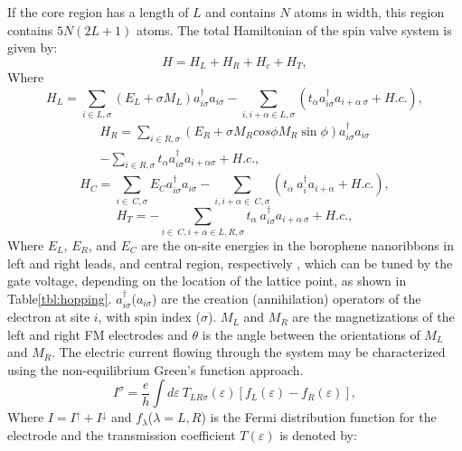 \documentclass[twoside,twocolumn,9pt]{article}
\begin{document}
If the core region has a length of $L$ and contains $N$ atoms in width, this region contains $5N(2L + 1)$ atoms. The total Hamiltonian of the spin valve system is given by:
\begin{equation}
    H= H_L + H_R + H_c + H_T,
\end{equation}
Where
\begin{equation}
H_{L}=\sum\limits_{i\in L,\sigma }{\left( E_{L}+\sigma M_{L} \right)} a_{i\sigma }^{\dagger} a_{i\sigma }-\sum\limits_{i,i+\alpha \in L,\sigma}{\left( t_{\alpha } a_{i\sigma}^{\dagger} a_{i+\alpha \ \sigma }+H.c.\right)},
\end{equation}
\begin{equation}
\begin{split}
H_{R}=\sum_{i\in R,\sigma}{\left( E_{R}+\sigma M_{R} cos\phi M_{R}\sin \phi\right)} a_{i\sigma}^{\dagger} a_{i\sigma } \\
-\sum_{i\in R,\sigma} t_{\alpha } a_{i\sigma}^{\dagger} a_{i+\alpha\sigma}+H.c.,
\end{split}
\end{equation}
\begin{equation}
H_{C}=\sum_{i\in \ C,\sigma }{{{E}_{C}}}a_{i\sigma }^{\dagger}{{a}_{i\sigma }}-\sum_{i,i+\alpha \in \ C,\sigma }{({{t}_{\alpha }}\ a_{i}^{\dagger }{{a}_{i+\alpha }}+H.c.)},
\end{equation}
\begin{equation}
H_{T}=-\sum_{i\in \ C,i+\alpha \in L,R,\sigma}{{{t}_{\alpha }}}\ a_{i\sigma }^{\dagger }{{a}_{i+\alpha \ \sigma }}+H.c.,
\end{equation}
Where $E_L$, $E_R$,  and $E_C$ are the on-site energies in the borophene nanoribbons in left and right leads, and central region, respectively , which can be tuned by the gate voltage,  depending on the location of the lattice point, as shown in Table\ref{tbl:hopping}. $a^{\dagger}_{i\sigma}$($a_{i\sigma}$) are the creation (annihilation) operators of the electron at site $i$, with spin index ($\sigma$). $M_L$ and $M_R$ are the magnetizations of the left and right FM electrodes and $\theta$ is the angle between the orientations of $M_L$ and $M_R$. The electric current flowing through the system may be characterized using the non-equilibrium Green's function approach.
\begin{equation}
    I^{\sigma}=\frac{e}{h}\int{d}\varepsilon \ {{T}_{LR\sigma}}(\varepsilon )[{{f}_{L}}(\varepsilon )-{{f}_{R}}(\varepsilon )],
\end{equation}
Where $I = I^{\uparrow} + I^{\downarrow}$ and $f_{\lambda}$($\lambda=L,R$) is the Fermi distribution function for the electrode and the transmission coefficient $T(\varepsilon)$ is denoted by:
\end{document}
